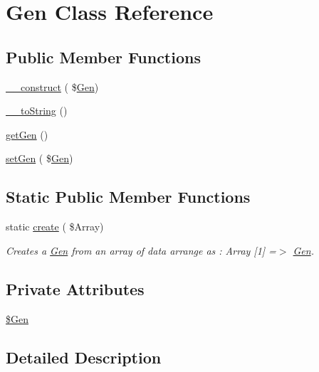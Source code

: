 \hypertarget{class_gen}{}\section{Gen Class Reference}
\label{class_gen}
\subsection*{Public Member Functions}
\begin{DoxyCompactItemize}
\item 
\hyperlink{class_gen_a0a565a32c339432838c841580ff38a72}{\+\_\+\+\_\+construct} ( \$\hyperlink{class_gen}{Gen})
\item 
\hyperlink{class_gen_a552f7d82c7054c2086a97761c59a09aa}{\+\_\+\+\_\+to\+String} ()
\item 
\hyperlink{class_gen_a73226bea244413aaded0a1f39fc2c168}{get\+Gen} ()
\item 
\hyperlink{class_gen_a3aedc456627f8abc8bd285d42622142e}{set\+Gen} ( \$\hyperlink{class_gen}{Gen})
\end{DoxyCompactItemize}
\subsection*{Static Public Member Functions}
\begin{DoxyCompactItemize}
\item 
static \hyperlink{class_gen_a2eff54119786637464f82e40ac285e1b}{create} ( \$Array)
\begin{DoxyCompactList}\small\item\em Creates a \hyperlink{class_gen}{Gen} from an array of data arrange as \+: Array \mbox{[}1\mbox{]} =$>$ \hyperlink{class_gen}{Gen}. \end{DoxyCompactList}\end{DoxyCompactItemize}
\subsection*{Private Attributes}
\begin{DoxyCompactItemize}
\item 
\hyperlink{class_gen_a1721942defb0950aa415466bac1caa00}{\$\+Gen}
\end{DoxyCompactItemize}


\subsection{Detailed Description}


